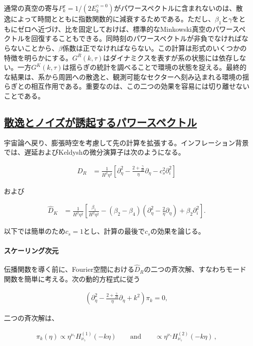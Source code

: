 \documentclass[a4paper,11pt]{ltjsarticle}
\newcommand{\subsectionlink}[1]{\subsection[#1]{\hyperlink{toc}{#1}}}
\numberwithin{equation}{section}
\begin{document}
通常の真空の寄与$P_k^\pi=1/(2E_k^{\gamma=0})$がパワースペクトルに含まれないのは、散逸によって時間とともに指数関数的に減衰するためである。ただし、$\beta_1$と$\gamma$をともにゼロへ近づけ、比を固定しておけば、標準的なMinkowski真空のパワースペクトルを回復することもできる。同時刻のパワースペクトルが非負でなければならないことから、$\beta$係数は正でなければならない。この計算は形式のいくつかの特徴を明らかにする。$G^R(k,\tau)$はダイナミクスを表すが系の状態には依存しない。一方$G^K(k,\tau)$は揺らぎの統計を調べることで環境の状態を捉える\cite{kamenev_2011}。最終的な結果は、系から周囲への散逸と、観測可能なセクターへ刻み込まれる環境の揺らぎとの相互作用である。重要なのは、この二つの効果を容易には切り離せないことである。

\subsectionlink{散逸とノイズが誘起するパワースペクトル}\label{subsec:dSPk}

宇宙論へ戻り、膨張時空を考慮して先の計算を拡張する。インフレーション背景では、遅延およびKeldyshの微分演算子は次のようになる。

\begin{align}\label{eq:DRexp}
\widehat{D}_{R} &= \frac{1}{H^2\eta^2} \left[\partial_\eta^2 - \frac{2 + \frac{\gamma}{H}}{\eta}\partial_\eta - c_s^2 \partial_i^2 \right]
\end{align}

および

\begin{align}\label{eq:GKexp}
\widehat{D}_K &=\frac{1}{H^2\eta^2}\left[\frac{\beta_1}{H^2\eta^2} - \left(\beta_2 - \beta_4\right) \left(\partial_\eta^2 -\frac{2}{\eta} \partial_\eta\right) + \beta_2 \partial_i^2  \right].
\end{align}

以下では簡単のため$c_s=1$とし、計算の最後で$c_s$の効果を論じる。

\paragraph{スケーリング次元} 伝播関数を導く前に、Fourier空間における$\widehat D_R$の二つの斉次解、すなわちモード関数を簡単に考える。次の動的方程式に従う

\begin{align}
\left(\partial_{\eta}^2 - \frac{2 + \frac{\gamma}{H}}{\eta}\partial_{\eta} +  k^2  \right) \pi_k =0,
\end{align}

二つの斉次解は、

\begin{align}
\pi_k(\eta) \propto \eta^{\nu_\gamma}  H^{(1)}_{\nu_\gamma}(- k \eta) \qquad \mathrm{and} \qquad \propto \eta^{\nu_\gamma} H^{(2)}_{\nu_\gamma}(- k \eta) \,,
\end{align}
\end{document}
